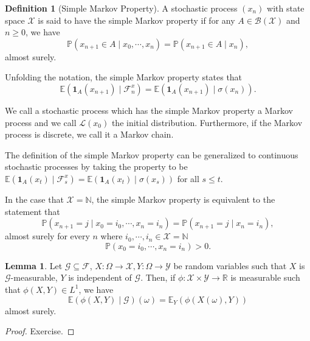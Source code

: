 \documentclass[]{article}
\theoremstyle{definition}
\theoremstyle{definition}
\newtheorem{definition}{Definition}[section]
\newtheorem{lemma}{Lemma}[section]
\begin{document}
\begin{definition}[Simple Markov Property]
  A stochastic process \((x_n)\) with state space \(\mathcal{X}\) is said to have the 
  simple Markov property if for any \(A \in \mathcal{B}(\mathcal{X})\) 
  and \(n \ge 0\), we have 
  \[\mathbb{P}(x_{n + 1} \in A \mid x_0, \cdots, x_n) = \mathbb{P}(x_{n + 1} \in A \mid x_n),\]
  almost surely.

  Unfolding the notation, the simple Markov property states that 
  \[\mathbb{E}(\mathbf{1}_A(x_{n + 1}) \mid \mathcal{F}^x_n) = 
    \mathbb{E}(\mathbf{1}_A(x_{n + 1}) \mid \sigma(x_n)).\]

  We call a stochastic process which has the simple Markov property a Markov 
  process and we call \(\mathcal{L}(x_0)\) the initial distribution. Furthermore, 
  if the Markov process is discrete, we call it a Markov chain. 
\end{definition}

The definition of the simple Markov property can be generalized to continuous 
stochastic processes by taking the property to be 
\(\mathbb{E}(\mathbf{1}_A(x_t) \mid \mathcal{F}^x_s) = 
\mathbb{E}(\mathbf{1}_A(x_t) \mid \sigma(x_s))\) for all \(s \le t\).

In the case that \(\mathcal{X} = \mathbb{N}\), the simple Markov property is 
equivalent to the statement that 
\[\mathbb{P}(x_{n + 1} = j \mid x_0 = i_0, \cdots, x_n = i_n) = 
  \mathbb{P}(x_{n + 1} = j \mid x_n = i_n),\]
almost surely for every \(n\) where \(i_0, \cdots, i_n \in \mathcal{X} = \mathbb{N}\)
\[\mathbb{P}(x_0 = i_0, \cdots, x_n = i_n) > 0.\]

\begin{lemma}
  Let \(\mathcal{G} \subseteq \mathcal{F}\), \(X : \Omega \to \mathcal{X}, 
  Y : \Omega \to \mathcal{Y}\) be random variables such that \(X\) is 
  \(\mathcal{G}\)-measurable, \(Y\) is independent of \(\mathcal{G}\). 
  Then, if \(\phi : \mathcal{X} \times \mathcal{Y} \to \mathbb{R}\) is measurable 
  such that \(\phi(X, Y) \in L^1\), we have 
  \[\mathbb{E}(\phi(X, Y) \mid \mathcal{G})(\omega) = \mathbb{E}_Y(\phi(X(\omega), Y))\]
  almost surely. 
\end{lemma}
\begin{proof}
  Exercise.
\end{proof}
\end{document}
